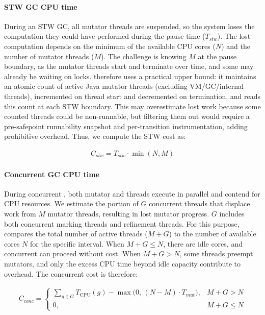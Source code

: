 \paragraph{\textbf{STW GC CPU time}}
During an STW GC, all mutator threads are suspended, so the system loses the computation they could have performed during the pause time ($T_\mathit{stw}$).
The lost computation depends on the minimum of the available CPU cores ($N$) and the number of mutator threads ($M$).
The challenge is knowing $M$ at the pause boundary, as the mutator threads start and terminate over time, and some may already be waiting on locks.
\flexheapName{} therefore uses a practical upper bound: it maintains an atomic count of active Java mutator threads (excluding VM/GC/internal threads), incremented on thread start and decremented on termination, and reads this count at each STW boundary.
This may overestimate lost work because some counted threads could be non-runnable, but filtering them out would require a pre-safepoint runnability snapshot and per-transition instrumentation, adding prohibitive overhead.
Thus, we compute the STW cost as:

\begin{align}
	\label{eq:gc_stw}
	\mathit{C}_\mathit{stw} = T_\mathit{stw} \cdot \min(N, M)
\end{align}

\paragraph{\textbf{Concurrent GC CPU time}}
During concurrent \flexheapGC{}, both mutator and \flexheapGC{} threads execute in parallel and contend for CPU resources.
We estimate the portion of $G$ concurrent \flexheapGC{} threads that displace work from $M$ mutator threads, resulting in lost mutator progress.
$G$ includes both concurrent marking threads and refinement threads.
For this purpose, \flexheapName{} compares the total number of active threads ($M + G$) to the number of available cores $N$ for the specific interval.
When $M + G \leq N$, there are idle cores, and concurrent \flexheapGC{} can proceed without cost.
When $M + G > N$, some \flexheapGC{} threads preempt mutators, and only the excess CPU time beyond idle capacity contribute to overhead.
The concurrent cost is therefore:

\begin{align}
	\label{eq:conc_gc}
	\mathit{C}_\mathit{conc} =
	\begin{cases}
		\displaystyle \sum_{g \in G} T_{\mathrm{CPU}}(g) - \max\bigl(0,\,(N - M)\cdot T_\mathit{mut}\bigr), & M + G > N    \\
		0,                                                                                                  & M + G \leq N
	\end{cases}
\end{align}

